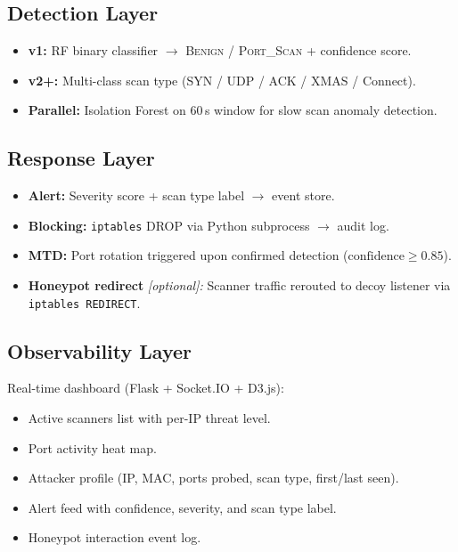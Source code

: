 \documentclass[12pt,a4paper]{article}
\begin{document}
\subsection{Detection Layer}
\begin{itemize}[nosep,leftmargin=1.5em]
  \item \textbf{v1:} RF binary classifier $\rightarrow$ \textsc{Benign} /
        \textsc{Port\_Scan} + confidence score.
  \item \textbf{v2+:} Multi-class scan type (SYN / UDP / ACK / XMAS / Connect).
  \item \textbf{Parallel:} Isolation Forest on 60\,s window for slow scan
        anomaly detection.
\end{itemize}

\subsection{Response Layer}
\begin{itemize}[nosep,leftmargin=1.5em]
  \item \textbf{Alert:} Severity score + scan type label $\rightarrow$ event store.
  \item \textbf{Blocking:} \texttt{iptables} DROP via Python subprocess
        $\rightarrow$ audit log.
  \item \textbf{MTD:} Port rotation triggered upon confirmed detection
        ($\text{confidence} \geq 0.85$).
  \item \textbf{Honeypot redirect} \textit{[optional]:} Scanner traffic
        rerouted to decoy listener via \texttt{iptables REDIRECT}.
\end{itemize}

\subsection{Observability Layer}
Real-time dashboard (Flask + Socket.IO + D3.js):
\begin{itemize}[nosep,leftmargin=1.5em]
  \item Active scanners list with per-IP threat level.
  \item Port activity heat map.
  \item Attacker profile (IP, MAC, ports probed, scan type, first/last seen).
  \item Alert feed with confidence, severity, and scan type label.
  \item Honeypot interaction event log.
\end{itemize}
\end{document}
